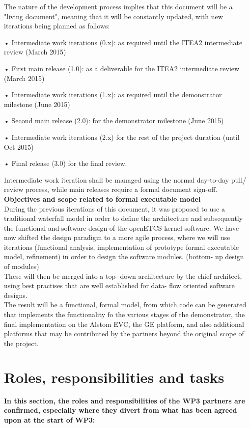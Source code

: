 The nature of the development process implies that this document will be a "living document", meaning that it will be constantly updated, with new iterations being planned as follows:

•  Intermediate work iterations (0.x): as required until the ITEA2 intermediate review (March 2015)

• First main release (1.0): as a deliverable for the ITEA2 intermediate review (March 2015)

• Intermediate work iterations (1.x): as required until the demonstrator milestone (June 2015)

•  Second main release (2.0): for the demonstrator milestone (June 2015)

•  Intermediate work iterations (2.x) for the rest of the project duration (until Oct 2015)

•  Final release (3.0) for the final review.

Intermediate work iteration shall be managed using the normal day-to-day pull/ review process, while main releases require a formal document sign-off.\\


\textbf{Objectives and scope related to formal executable model}\\

During the previous iterations of this document, it was proposed to use a traditional waterfall model in order to define the architecture and subsequently the functional and software design of the openETCS kernel software.
We have now shifted the design paradigm to a more agile process, where we will use iterations (functional analysis, implementation of prototype formal executable model, refinement) in order to design the software modules. (bottom- up design of modules)\\
These will then be merged into a top- down architecture by the chief architect, using best practises that are well established for data- flow oriented software designs.\\

The result will be a functional, formal model, from which code can be generated that implements the functionality fo the various stages of the demonstrator, the final implementation on the Alstom EVC, the GE platform, and also additional platforms that may be contributed by the partners beyond the original scope of the project.\\



\section{Roles, responsibilities and tasks}
\textbf{In this section, the roles and responsibilities of the WP3 partners are confirmed, especially where they divert from what has been agreed upon at the start of WP3:}

